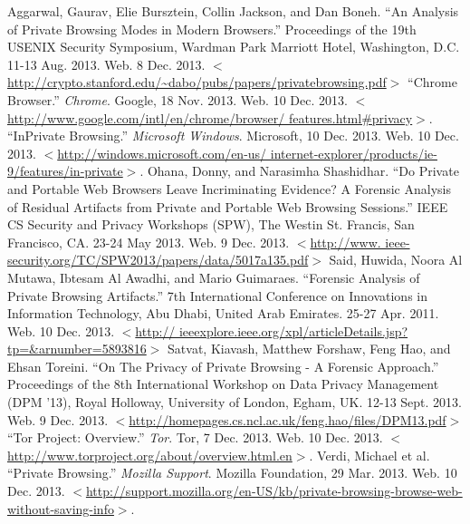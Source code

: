 \documentclass[pdftex,letterpaper,titlepage,12pt]{article}
\begin{document}
  \singlespacing
  \begin{thebibliography}{9}
	  Aggarwal, Gaurav, Elie Bursztein, Collin Jackson, and Dan Boneh.
	  ``An Analysis of Private Browsing Modes in Modern Browsers.''
	  Proceedings of the 19th USENIX Security Symposium,  Wardman Park Marriott
	  Hotel, Washington, D.C. 11-13 Aug. 2013. Web. 8 Dec. 2013. $<$
	  \url{http://crypto.stanford.edu/~dabo/pubs/papers/privatebrowsing.pdf}$>$
      ``Chrome Browser.'' \emph{Chrome}. Google, 18 Nov. 2013. Web. 10 Dec. 
      2013. $<$\url{http://www.google.com/intl/en/chrome/browser/
      features.html#privacy}$>$.
      ``InPrivate Browsing.'' \emph{Microsoft Windows}. Microsoft, 10 Dec. 
      2013. Web. 10 Dec. 2013. $<$\url{http://windows.microsoft.com/en-us/
      internet-explorer/products/ie-9/features/in-private}$>$.
      Ohana, Donny, and Narasimha Shashidhar. ``Do Private and Portable Web 
      Browsers Leave Incriminating Evidence? A Forensic Analysis of Residual 
      Artifacts from Private and Portable Web Browsing Sessions.'' IEEE CS 
      Security and Privacy Workshops (SPW), The Westin St. Francis, 
      San Francisco, CA. 23-24 May 2013. Web. 9 Dec. 2013. $<$\url{http://www.
      ieee-security.org/TC/SPW2013/papers/data/5017a135.pdf}$>$
      Said, Huwida, Noora Al Mutawa, Ibtesam Al Awadhi, and Mario Guimaraes.
      ``Forensic Analysis of Private Browsing Artifacts.'' 7th International
      Conference on Innovations in Information Technology, Abu Dhabi, United
      Arab Emirates. 25-27 Apr. 2011. Web. 10 Dec. 2013. $<$\url{http://
      ieeexplore.ieee.org/xpl/articleDetails.jsp?tp=&arnumber=5893816}$>$ 
      Satvat, Kiavash, Matthew Forshaw, Feng Hao, and Ehsan Toreini. ``On The 
      Privacy of Private Browsing - A Forensic Approach.'' Proceedings of the 
      8th International Workshop on Data Privacy Management (DPM '13), Royal 
      Holloway, University of London, Egham, UK. 12-13 Sept. 2013. Web. 9 Dec.
      2013. $<$\url{http://homepages.cs.ncl.ac.uk/feng.hao/files/DPM13.pdf}$>$ 
      ``Tor Project: Overview.'' \emph{Tor}. Tor, 7 Dec. 2013. Web. 10 Dec. 
      2013. $<$\url{http://www.torproject.org/about/overview.html.en}$>$. 
      Verdi, Michael et al. ``Private Browsing.'' \emph{Mozilla Support}. 
      Mozilla Foundation, 29 Mar. 2013. Web. 10 Dec. 2013. 
      $<$\url{http://support.mozilla.org/en-US/kb/private-browsing-browse-web-
      without-saving-info}$>$.
  \end{thebibliography}
\end{document}

